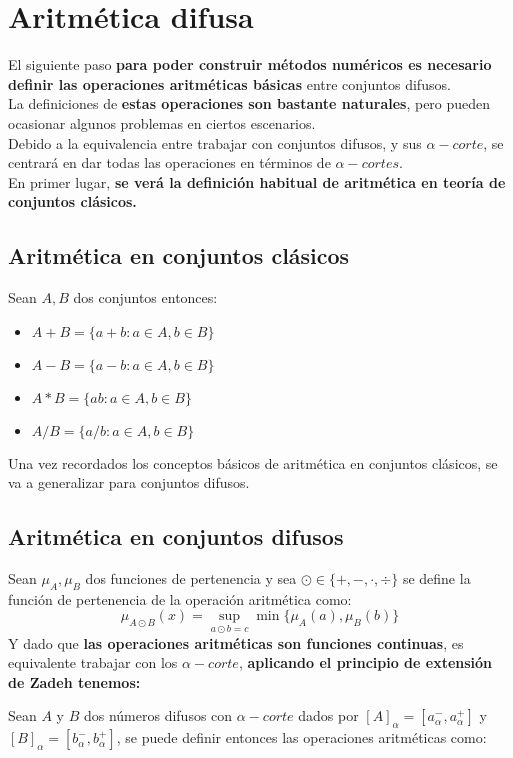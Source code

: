   \section{Aritmética difusa}
  El siguiente paso \textbf{para poder construir métodos numéricos es necesario definir las operaciones aritméticas básicas} entre conjuntos difusos.\\
  La definiciones de \textbf{estas operaciones son bastante naturales}, pero pueden ocasionar algunos problemas en ciertos escenarios.\\
  Debido a la equivalencia entre trabajar con conjuntos difusos, y sus $\alpha-corte$, se centrará en dar todas las operaciones en términos de $\alpha-cortes$.\\
  En primer lugar, \textbf{se verá la definición habitual de aritmética en teoría de conjuntos clásicos.}

  \subsection{Aritmética en conjuntos clásicos}
  Sean $A, B$ dos conjuntos entonces:
  \begin{itemize}
  \item $A+B=\{a+b : a \in A, b\in B\}$
  \item $A - B =\{a - b : a \in A, b\in B\}$
  \item $A * B =\{ab : a \in A, b\in B\}$
  \item $A / B =\{a/b : a \in A, b\in B\}$
  \end{itemize}

  Una vez recordados los conceptos básicos de aritmética en conjuntos clásicos, se va a generalizar para conjuntos difusos.

  \subsection{Aritmética en conjuntos difusos}
  Sean $\mu_A, \mu_B$ dos funciones de pertenencia y sea $\odot \in \{+, -, \cdot, \div\}$ se define la función de pertenencia de la operación aritmética como:
  $$
  \mu_{A \odot B}(x) = \sup_{a \odot b = c} \min\{\mu_A(a), \mu_B(b)\}
  $$
  Y dado que \textbf{las operaciones aritméticas son funciones continuas}, es equivalente trabajar con los $\alpha-corte$, \textbf{aplicando el principio de extensión de Zadeh tenemos:}

  Sean $A$ y $B$ dos números difusos con $\alpha-corte$ dados por $[A]_\alpha=[a_\alpha^-, a_\alpha^+]$ y $[B]_\alpha=[b_\alpha^-, b_\alpha^+]$, se puede definir entonces las operaciones aritméticas como:

